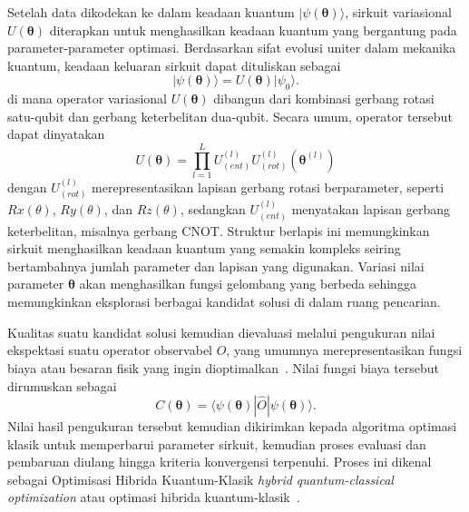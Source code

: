Setelah data dikodekan ke dalam keadaan kuantum $|\psi(\boldsymbol{\theta})\rangle$, sirkuit variasional $U(\boldsymbol{\theta})$ diterapkan untuk menghasilkan keadaan kuantum yang bergantung pada parameter-parameter optimasi. Berdasarkan sifat evolusi uniter dalam mekanika kuantum, keadaan keluaran sirkuit dapat dituliskan sebagai
\begin{equation}
\label{eq:vqa_state}
|\psi(\boldsymbol{\theta})\rangle = U(\boldsymbol{\theta})|\psi_0\rangle.
\end{equation}
di mana operator variasional $U(\boldsymbol{\theta})$ dibangun dari kombinasi gerbang rotasi satu-qubit dan gerbang keterbelitan dua-qubit. Secara umum, operator tersebut dapat dinyatakan
\begin{equation}
    U(\boldsymbol{\theta}) = \prod_{l=1}^L U_{(ent)}^{(l)} U_{(rot)}^{(l)} (\boldsymbol{\theta}^{(l)})
\end{equation}
dengan $U_{(rot)}^{(l)}$ merepresentasikan lapisan gerbang rotasi berparameter, seperti $Rx(\theta)$, $Ry(\theta)$, dan $Rz (\theta)$, sedangkan $U_{(ent)}^{(l)}$ menyatakan lapisan gerbang keterbelitan, misalnya gerbang CNOT. Struktur berlapis ini memungkinkan sirkuit menghasilkan keadaan kuantum yang semakin kompleks seiring bertambahnya jumlah parameter dan lapisan yang digunakan. Variasi nilai parameter $\boldsymbol{\theta}$ akan menghasilkan fungsi gelombang yang berbeda sehingga memungkinkan eksplorasi berbagai kandidat solusi di dalam ruang pencarian.

Kualitas suatu kandidat solusi kemudian dievaluasi melalui pengukuran nilai ekspektasi suatu operator observabel $\hat{O}$, yang umumnya merepresentasikan fungsi biaya atau besaran fisik yang ingin dioptimalkan~. Nilai fungsi biaya tersebut dirumuskan sebagai
\begin{equation}
\label{eq:vqa_cost}
C(\boldsymbol{\theta}) = \langle \psi(\boldsymbol{\theta})| \hat{O} |\psi(\boldsymbol{\theta})\rangle.
\end{equation}
Nilai hasil pengukuran tersebut kemudian dikirimkan kepada algoritma optimasi klasik untuk memperbarui parameter sirkuit, kemudian proses evaluasi dan pembaruan diulang hingga kriteria konvergensi terpenuhi. Proses ini dikenal sebagai Optimisasi Hibrida Kuantum-Klasik \textit{hybrid quantum-classical optimization} atau optimasi hibrida kuantum-klasik~.